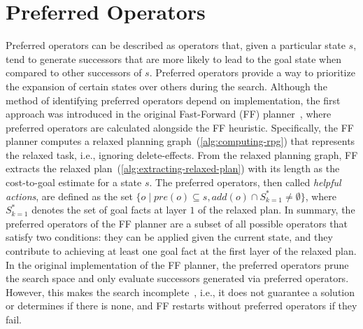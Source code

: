 \documentclass[ppgc,diss,english]{iiufrgs}
\newcommand{\ppi}[2][inline]{\todo[color=purple!50,linecolor={purple!100},#1,fancyline,author=Pedro]{#2}}
\begin{document}
\section{Preferred Operators}
\label{sec:background-preferred-operators}
\ppi{Dar mais detalhes.}
Preferred operators can be described as operators that, given a particular state $s$, tend to generate successors that are more likely to lead to the goal state when compared to other successors of $s$. Preferred operators provide a way to prioritize the expansion of certain states over others during the search. Although the method of identifying preferred operators depend on implementation, the first approach was introduced in the original Fast-Forward (FF) planner~\cite{Hoffmann.Nebel/2001}, where preferred operators are calculated alongside the FF heuristic.
Specifically, the FF planner computes a relaxed planning graph~(\cref{alg:computing-rpg}) that represents the relaxed task, i.e., ignoring delete-effects. From the relaxed planning graph, FF extracts the relaxed plan~(\cref{alg:extracting-relaxed-plan}) with its length as the cost-to-goal estimate for a state $s$. The preferred operators, then called \emph{helpful actions}, are defined as the set $\{o \mid pre(o) \subseteq s, add(o) \cap S_{k=1}^{*} \neq \emptyset \}$, where $S_{k=1}^{*}$ denotes the set of goal facts at layer $1$ of the relaxed plan. In summary, the preferred operators of the FF planner are a subset of all possible operators that satisfy two conditions: they can be applied given the current state, and they contribute to achieving at least one goal fact at the first layer of the relaxed plan. In the original implementation of the FF planner, the preferred operators prune the search space and only evaluate successors generated via preferred operators. However, this makes the search incomplete~\cite{Richter.Helmert/2009}, i.e., it does not guarantee a solution or determines if there is none, and FF restarts without preferred operators if they fail.
\end{document}
